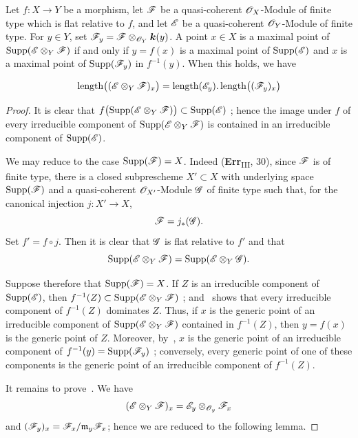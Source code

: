 \begin{proposition}[2.5.5]
\label{IV.2.5.5}
Let $f:X\to Y$ be a morphism, let $\mathscr{F}$ be a quasi-coherent
$\mathscr{O}_X$-Module of finite type which is flat relative to $f$, and let
$\mathscr{E}$ be a quasi-coherent $\mathscr{O}_Y$-Module of finite type. For
$y\in Y$, set $\mathscr{F}_y=\mathscr{F}\otimes_{\mathscr{O}_Y}\boldsymbol{k}(y)$.
A point $x\in X$ is a maximal point of
$\operatorname{Supp}(\mathscr{E}\otimes_Y\mathscr{F})$ if and only if
$y=f(x)$ is a maximal point of $\operatorname{Supp}(\mathscr{E})$ and $x$
is a maximal point of $\operatorname{Supp}(\mathscr{F}_y)$ in $f^{-1}(y)$.
When this holds, we have
\end{proposition}

\begin{env}[2.5.5.1]
\label{IV.2.5.5.1}
\[
  \operatorname{length}\bigl((\mathscr{E}\otimes_Y\mathscr{F})_x\bigr)
  =
  \operatorname{length}(\mathscr{E}_y).
  \operatorname{length}\bigl((\mathscr{F}_y)_x\bigr)
\]
\end{env}

\begin{proof}
It is clear that $f\bigl(\operatorname{Supp}(\mathscr{E}\otimes_Y\mathscr{F})\bigr)
\subset \operatorname{Supp}(\mathscr{E})$
; hence the image under $f$ of every irreducible
component of $\operatorname{Supp}(\mathscr{E}\otimes_Y\mathscr{F})$ is contained
in an irreducible component of $\operatorname{Supp}(\mathscr{E})$.

  We may reduce to the case $\operatorname{Supp}(\mathscr{F})=X$. Indeed
  \textnormal{(}\textbf{Err}\textsubscript{III}, 30\textnormal{)},
  since $\mathscr{F}$ is of finite type, there is a closed subprescheme
  $X'\subset X$ with underlying space $\operatorname{Supp}(\mathscr{F})$ and a
  quasi-coherent $\mathscr{O}_{X'}$-Module $\mathscr{G}$ of finite type such that,
  for the canonical injection $j:X'\to X$,
  \[
    \mathscr{F}=j_*(\mathscr{G}).
  \]
  Set $f'=f\circ j$. Then it is clear that $\mathscr{G}$ is flat relative to $f'$ and that
  \[
    \operatorname{Supp}(\mathscr{E}\otimes_Y\mathscr{F})
    =
    \operatorname{Supp}(\mathscr{E}\otimes_Y\mathscr{G}).
  \]

  Suppose therefore that $\operatorname{Supp}(\mathscr{F})=X$. If $Z$ is an
  irreducible component of $\operatorname{Supp}(\mathscr{E})$, then $f^{-1}(Z)\subset
\operatorname{Supp}(\mathscr{E}\otimes_Y\mathscr{F})$
  ; and~ shows that every irreducible
  component of $f^{-1}(Z)$ dominates $Z$. Thus, if $x$ is the generic
  point of an irreducible component of
  $\operatorname{Supp}(\mathscr{E}\otimes_Y\mathscr{F})$ contained in $f^{-1}(Z)$,
  then $y=f(x)$ is the generic point of $Z$. Moreover,
  by~, $x$ is the generic point of an irreducible
  component of $f^{-1}(y)=\operatorname{Supp}(\mathscr{F}_y)$
  ; conversely, every generic point of one of these
  components is the generic point of an irreducible component of
  $f^{-1}(Z)$.


It remains to prove~. We have
\[
  (\mathscr{E}\otimes_Y\mathscr{F})_x
  =
  \mathscr{E}_y\otimes_{\mathscr{O}_y}\mathscr{F}_x
\]
 and
$(\mathscr{F}_y)_x=\mathscr{F}_x/\mathfrak{m}_y\mathscr{F}_x$; hence we are reduced to
the following lemma.
\end{proof}

